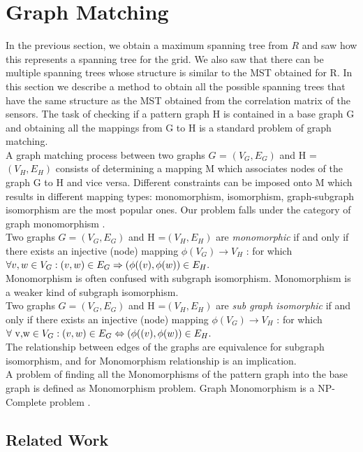 
\section{Graph Matching} 

In the previous section, we obtain a maximum spanning tree from $R$ and saw how this represents a spanning tree for the grid. We also saw that there can be multiple spanning trees whose structure is similar to the MST obtained for R. In this section we describe a method to obtain all the possible spanning trees that have the same structure as the MST obtained from the correlation matrix of the sensors.
The task of checking if a pattern graph H is contained in a base graph G and obtaining all the mappings from G to H is a standard problem of graph matching.\\

A graph matching process between two graphs $G$ = $(V_G,E_G)$ and H = $(V_H,E_H)$ consists of determining a mapping M which associates nodes of the graph G to H and vice versa. Different constraints can be imposed onto M which results in different mapping types: monomorphism, isomorphism, graph-subgraph isomorphism are the most popular ones. Our problem falls under the category of graph monomorphism . \\
Two graphs 
 $G =( V_G, E_G)$ and
 H =$( V_H, E_H)$  are \textit{monomorphic}  if and only if there exists an injective (node)
mapping $\phi (V_G) \rightarrow  V_H$ : for which $\forall v,w \in V_G:(v,w) \in E_G \Rightarrow (\phi((v),\space \phi(w)) \in E_H.$ \cite{singler2005graph}\\  
Monomorphism is often confused with subgraph isomorphism. Monomorphism is a weaker kind of subgraph isomorphism. \\
Two graphs  $G =( V_G, E_G)$ and
 H =$( V_H, E_H)$  are \textit{sub graph isomorphic}  if and only if there exists an injective (node)
mapping $\phi( V_G) \rightarrow  V_H$ : for which $\forall \text{ v,w} \in V_G:(v,w) \in E_G \Leftrightarrow (\phi((v),\space \phi(w)) \in E_H.$ \cite{singler2005graph}\\
The relationship between edges of the graphs are equivalence for subgraph isomorphism, and for Monomorphism  relationship  is an implication.\\
A problem of finding all the Monomorphisms of the pattern graph into the base graph is defined as Monomorphism problem. Graph Monomorphism is a NP-Complete problem \cite{Garey:1979:CIG:578533}. 
\subsection{Related Work}

